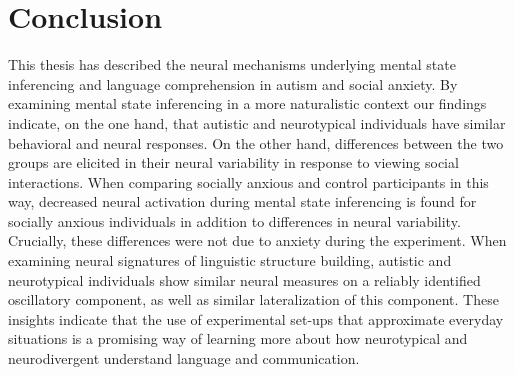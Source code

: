 \section{Conclusion}

This thesis has described the neural mechanisms underlying mental state inferencing and language comprehension in autism and social anxiety. By examining mental state inferencing in a more naturalistic context our findings indicate, on the one hand, that autistic and neurotypical individuals have similar behavioral and neural responses. On the other hand, differences between the two groups are elicited in their neural variability in response to viewing social interactions. When comparing socially anxious and control participants in this way, decreased neural activation during mental state inferencing is found for socially anxious individuals in addition to differences in neural variability. Crucially, these differences were not due to anxiety during the experiment. When examining neural signatures of linguistic structure building, autistic and neurotypical individuals show similar neural measures on a reliably identified oscillatory component, as well as similar lateralization of this component. These insights indicate that the use of experimental set-ups that approximate everyday situations is a promising way of learning more about how neurotypical and neurodivergent understand language and communication. 